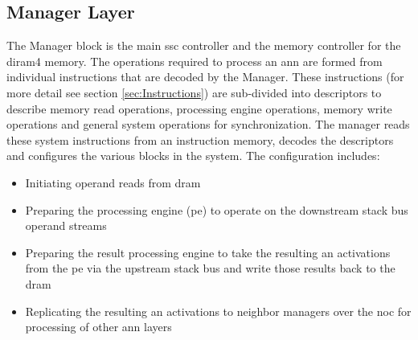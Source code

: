 \iffalse 
Each of the \ac{diram4} memories contain two channels with each channel containing 32 banks and each bank contains 4096 \SI[per-mode=symbol]{4}{\kilo\bit} pages.
\fi

\subsection{Manager Layer}
The Manager block is the main \ac{ssc} controller and the memory controller for the \ac{diram4} memory. 
The operations required to process an \ac{ann} are formed from individual instructions that are decoded by the Manager. 
These instructions (for more detail see section \ref{sec:Instructions}) are sub-divided into descriptors to describe memory read operations, processing engine operations, memory write operations and general system operations for synchronization. 
The manager reads these system instructions from an instruction memory, decodes the descriptors and configures the various blocks in the system.
The configuration includes:
\begin{itemize}
      \item Initiating operand reads from \ac{dram}
      \item Preparing the processing engine (\ac{pe}) to operate on the downstream stack bus operand streams
      \item Preparing the result processing engine to take the resulting \ac{an} activations from the \ac{pe} via the upstream stack bus and write those results back to the \ac{dram}
      \item Replicating the resulting \ac{an} activations to neighbor managers over the \ac{noc} for processing of other \ac{ann} layers
\end{itemize}

